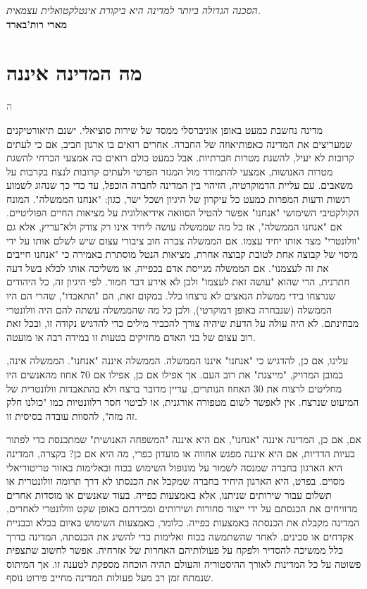 \documentclass[10pt,oneside]{book}
\newcommand{\emptypage}{
  \newpage
  \thispagestyle{empty}
  \vspace*{\fill}
  \vspace*{\fill}
  \newpage
}
\newcommand{\hebrewchapter}[2]{%
  \chapter*{#1}%
  \addcontentsline{toc}{chapter}{#1}%
  \lettrine[lines=4, lhang=0.1, loversize=0.5, findent=0pt]{\textcolor{gray} #2}{}%
}
\begin{document}

\thispagestyle{empty}
\begin{center}
\vspace*{5cm}
\textit{הסכנה הגדולה ביותר למדינה היא ביקורת אינטלקטואלית עצמאית.} \\
\vspace{1em}
\textbf{מארי רות'בארד}
\end{center}
\newpage



\tableofcontents
\newpage

\hebrewchapter{מה המדינה איננה}{ה}
מדינה נחשבת כמעט באופן אוניברסלי ממסד של שירות סוציאלי.
ישנם תיאורטיקנים שמעריצים את המדינה כאפותיאוזה של החברה.
אחרים רואים בו ארגון חביב, אם כי לעתים קרובות לא יעיל, להשגת מטרות חברתיות.
אבל כמעט כולם רואים בה אמצעי הכרחי להשגת מטרות האנושות, אמצעי להתמודד מול המגזר הפרטי ולעתים קרובות לנצח בקרבות על משאבים.
עם עליית הדמוקרטיה, הזיהוי בין המדינה לחברה הוכפל, עד כדי כך שנהוג לשמוע רגשות ודעות המפרות כמעט כל עיקרון של היגיון ושכל ישר, כגון: "אנחנו הממשלה".
המונח הקולקטיבי השימושי "אנחנו" אפשר להטיל הסוואה אידיאולוגית על מציאות החיים הפוליטיים.
אם "אנחנו הממשלה", אז כל מה שממשלה עושה ליחיד אינו רק צודק ולא־עריץ, אלא גם "וולונטרי" מצד אותו יחיד עצמו.
אם הממשלה צברה חוב ציבורי עצום שיש לשלם אותו על ידי מיסוי של קבוצה אחת לטובת קבוצה אחרת, מציאות הנטל מוסתרת באמירה כי "אנחנו חייבים את זה לעצמנו".
אם הממשלה מגייסת אדם בכפייה, או משליכה אותו לכלא בשל דעה חתרנית, הרי שהוא "עושה זאת לעצמו" ולכן לא אירע דבר חמור.
לפי היגיון זה, כל היהודים שנרצחו בידי ממשלת הנאצים לא נרצחו כלל.
במקום זאת, הם "התאבדו", שהרי הם היו הממשלה (שנבחרה באופן דמוקרטי), ולכן כל מה שהממשלה עשתה להם היה וולונטרי מבחינתם.
לא היה עולה על הדעת שיהיה צורך להכביר מילים כדי להדגיש נקודה זו, ובכל זאת רוב עצום של בני האדם מחזיקים בטעות זו במידה רבה או מועטה.

עלינו, אם כן, להדגיש כי "אנחנו" איננו הממשלה.
הממשלה איננה "אנחנו". הממשלה אינה, במובן המדויק, "מייצגת" את רוב העם.
אך אפילו אם כן, אפילו אם 70 אחוז מהאנשים היו מחליטים לרצוח את 30 האחוז הנותרים, עדיין מדובר ברצח ולא בהתאבדות וולונטרית של המיעוט שנרצח.
אין לאפשר לשום מטפורה אורגנית, או לביטוי חסר רלוונטיות כמו "כולנו חלק זה מזה", להסוות עובדה בסיסית זו.

אם, אם כן, המדינה איננה "אנחנו", אם היא איננה "המשפחה האנושית" שמתכנסת כדי לפתור בעיות הדדיות, אם היא איננה מפגש אחווה או מועדון כפרי, מה היא אם כן?
בקצרה, המדינה היא הארגון בחברה שמנסה לשמור על מונופול השימוש בכוח ובאלימות באזור טריטוריאלי מסוים.
בפרט, היא הארגון היחיד בחברה שמקבל את הכנסתו לא דרך תרומה וולונטרית או תשלום עבור שירותים שניתנו, אלא באמצעות כפייה.
בעוד שאנשים או מוסדות אחרים מרוויחים את הכנסתם על ידי ייצור סחורות ושירותים ומכירתם באופן שקט ווולונטרי לאחרים, המדינה מקבלת את הכנסתה באמצעות כפייה.
כלומר, באמצעות השימוש באיום בכלא ובבניית אקדחים או סכינים.
לאחר שהשתמשה בכוח ואלימות כדי להשיג את הכנסתה, המדינה בדרך כלל ממשיכה להסדיר ולפקח על פעולותיהם האחרות של אזרחיה.
אפשר לחשוב שתצפית פשוטה על כל המדינות לאורך ההיסטוריה והעולם תהיה הוכחה מספקת לטענה זו. אך המיתוס שנמתח זמן רב מעל פעולות המדינה מחייב פירוט נוסף.
\end{document}
